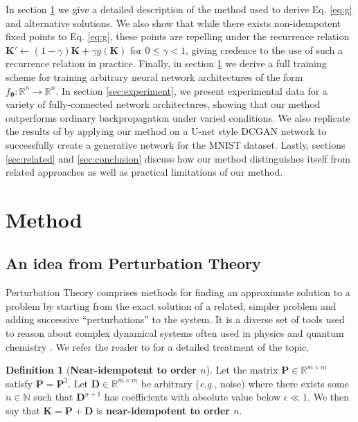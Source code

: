 \documentclass{article}
\theoremstyle{plain}
\theoremstyle{definition}
\newtheorem{definition}[theorem]{Definition}
\theoremstyle{remark}
\newcommand{\vD}{\mathbf{D}}
\newcommand{\vK}{\mathbf{K}}
\newcommand{\vP}{\mathbf{P}}
\newcommand{\vtheta}{\bm{\theta}}
\begin{document}
In section \ref{sec:method} we give a detailed description of the method used to derive Eq. \ref{eq:g} and alternative solutions. We also show that while there exists non-idempotent fixed points to Eq. \ref{eq:g}, these points are repelling under the recurrence relation ${\vK' \leftarrow (1 - \gamma)\vK + \gamma g(\vK)}$ for $0 \leq \gamma < 1$, giving credence to the use of such a recurrence relation in practice. Finally, in section \ref{sec:method} we derive a full training scheme for training arbitrary neural network architectures of the form $f_{\vtheta}: \mathbb{R}^n \to \mathbb{R}^n$. In section \ref{sec:experiment}, we present experimental data for a variety of fully-connected network architectures, showing that our method outperforms ordinary backpropagation under varied conditions. We also replicate the results of \cite{shocher-ign} by applying our method on a U-net style DCGAN network to successfully create a generative network for the MNIST dataset. Lastly, sections \ref{sec:related} and \ref{sec:conclusion} discuss how our method distinguishes itself from related approaches as well as practical limitations of our method.

\section{Method}
\label{sec:method}

\subsection{An idea from Perturbation Theory}
Perturbation Theory comprises methods for finding an approximate solution to a problem by starting from the exact solution of a related, simpler problem and adding successive ``perturbations'' to the system. It is a diverse set of tools used to reason about complex dynamical systems often used in physics and quantum chemistry \cite{hirschfelder-dev-perturb}. We refer the reader to \cite{intro-pertub-theory} for a detailed treatment of the topic.


\begin{definition}[\textbf{Near-idempotent to order $n$}]
    Let the matrix $\vP \in \mathbb{R}^{m \times m}$ satisfy $\vP = \vP^2$. Let ${\vD \in \mathbb{R}^{m \times m}}$ be arbitrary (\textit{e.g.}, noise) where there exists some $n \in \mathbb{N}$ such that $\vD^{n+1}$ has coefficients with absolute value below $\epsilon \ll 1$. We then say that $\vK = \vP + \vD$ is \textbf{near-idempotent to order $n$}.
    \label{def:near-idem}
\end{definition}
\end{document}
